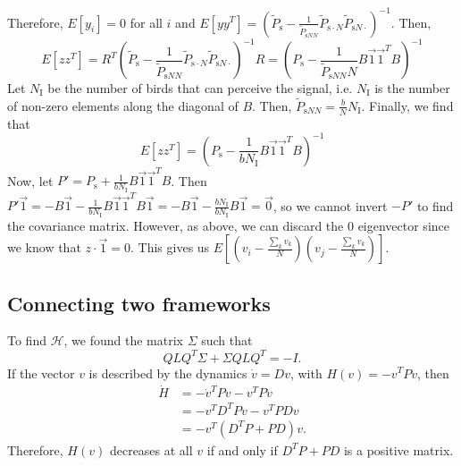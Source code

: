 \documentclass{article}
\begin{document}
Therefore, $E[y_i]=0$ for all $i$ and $E[yy^T]=(\tilde{P}_{\text{s}}-\frac{1}{\tilde{P}_{\text{s}NN}}\tilde{P}_{\text{s}\cdot N}\tilde{P}_{\text{s}N\cdot })^{-1}$. Then, 
\begin{equation*}
E[zz^T]=R^T\left(\tilde{P}_{\text{s}}-\frac{1}{\tilde{P}_{\text{s}NN}}\tilde{P}_{\text{s}\cdot N}\tilde{P}_{\text{s}N\cdot }\right)^{-1}R=\left(P_\text{s}-\frac{1}{\tilde{P}_{\text{s}NN}N}B\vec{1}\vec{1}^TB\right)^{-1}
\end{equation*}
Let $N_\text{I}$ be the number of birds that can perceive the signal, i.e. $N_\text{I}$ is the number of non-zero elements along the diagonal of $B$. Then, $\tilde{P}_{\text{s}NN}=\frac{b}{N}N_\text{I}$. 
Finally, we find that 
\begin{equation}
E[zz^T]=\left(P_\text{s}-\frac{1}{bN_\text{I}}B\vec{1}\vec{1}^TB\right)^{-1}
\end{equation}
Now, let $P'=P_\text{s}+\frac{1}{bN_\text{I}}B\vec{1}\vec{1}^TB$. Then $P'\vec{1}=-B\vec{1}-\frac{1}{bN_\text{I}}B\vec{1}\vec{1}^TB\vec{1}=-B\vec{1}-\frac{bN_\text{I}}{bN_\text{I}}B\vec{1}=\vec{0}$, so we cannot invert $-P'$ to find the covariance matrix. However, as above, we can discard the $0$ eigenvector since we know that $z\cdot \vec{1}=0$. This gives us $E[(v_i-\frac{\sum_kv_k}{N})(v_j-\frac{\sum_kv_k}{N})]$.

\subsection{Connecting two frameworks }
To find $\mathscr{H}$, we found the matrix $\Sigma$ such that 
\begin{equation}
QLQ^T\Sigma+\Sigma QLQ^T=-I.
\end{equation}
If the vector $v$ is described by the dynamics $\dot{v}=Dv$, with $H(v)=-v^TPv$, then
\begin{align*}
\dot{H}&=-\dot{v}^TPv-v^TP\dot{v}
\\&=-v^TD^TPv-v^TPDv
\\&=-v^T(D^TP+PD)v.
\end{align*}
Therefore, $H(v)$ decreases at all $v$ if and only if $D^TP+PD$ is a positive matrix.

%
%
%
%
%
%
%
%
%
%
%
%
\end{document}
